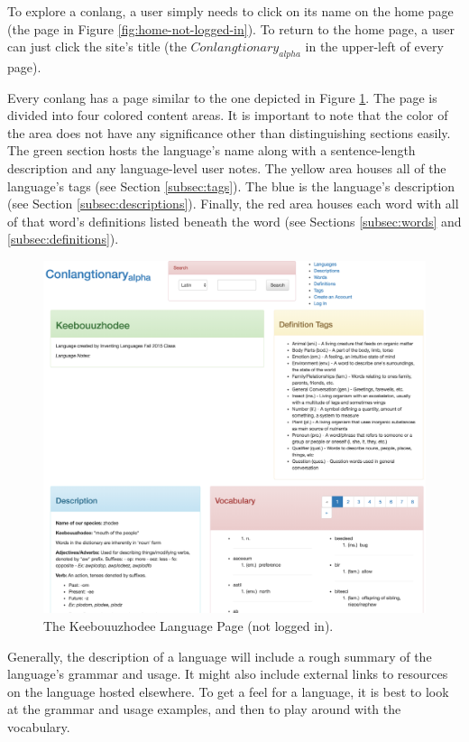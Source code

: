 To explore a conlang, a user simply needs to click on its name on the home page (the page in Figure \ref{fig:home-not-logged-in}). To return to the home page, a user can just click the site's title (the $Conlangtionary_{alpha}$ in the upper-left of every page).

Every conlang has a page similar to the one depicted in Figure \ref{fig:keebouuzhodee-not-logged-in}. The page is divided into four colored content areas. It is important to note that the color of the area does not have any significance other than distinguishing sections easily. The green section hosts the language's name along with a sentence-length description and any language-level user notes. The yellow area houses all of the language's tags (see Section \ref{subsec:tags}). The blue is the language's description (see Section \ref{subsec:descriptions}). Finally, the red area houses each word with all of that word's definitions listed beneath the word (see Sections \ref{subsec:words} and \ref{subsec:definitions}).

\begin{figure}[!h]
\includegraphics[width=\textwidth]{figures/keebouuzhodee-not-logged-in}
\caption{The Keebouuzhodee Language Page (not logged in).}
\centering
\label{fig:keebouuzhodee-not-logged-in}
\end{figure}

Generally, the description of a language will include a rough summary of the language's grammar and usage. It might also include external links to resources on the language hosted elsewhere. To get a feel for a language, it is best to look at the grammar and usage examples, and then to play around with the vocabulary.

